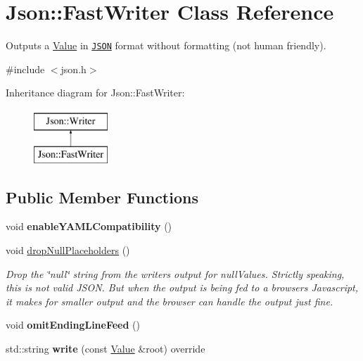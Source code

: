 \hypertarget{class_json_1_1_fast_writer}{}\section{Json\+:\+:Fast\+Writer Class Reference}
\label{class_json_1_1_fast_writer}


Outputs a \hyperlink{class_json_1_1_value}{Value} in \href{http://www.json.org}{\tt J\+S\+ON} format without formatting (not human friendly).  




{\ttfamily \#include $<$json.\+h$>$}

Inheritance diagram for Json\+:\+:Fast\+Writer\+:\begin{figure}[H]
\begin{center}
\leavevmode
\includegraphics[height=2.000000cm]{class_json_1_1_fast_writer}
\end{center}
\end{figure}
\subsection*{Public Member Functions}
\begin{DoxyCompactItemize}
\item 
\mbox{\label{class_json_1_1_fast_writer_a78d98e9f76d33660ad6e6a1abe287d45}} 
void {\bfseries enable\+Y\+A\+M\+L\+Compatibility} ()
\item 
\mbox{\label{class_json_1_1_fast_writer_a6e93d8dce951e408517311026a065b40}} 
void \hyperlink{class_json_1_1_fast_writer_a6e93d8dce951e408517311026a065b40}{drop\+Null\+Placeholders} ()
\begin{DoxyCompactList}\small\item\em Drop the \char`\"{}null\char`\"{} string from the writer\textquotesingle{}s output for null\+Values. Strictly speaking, this is not valid J\+S\+ON. But when the output is being fed to a browser\textquotesingle{}s Javascript, it makes for smaller output and the browser can handle the output just fine. \end{DoxyCompactList}\item 
\mbox{\label{class_json_1_1_fast_writer_af4ee077d365d75941fb2688d97207a55}} 
void {\bfseries omit\+Ending\+Line\+Feed} ()
\item 
\mbox{\label{class_json_1_1_fast_writer_aee69e3f778982ec9218c1a5a7c6a3e7a}} 
std\+::string {\bfseries write} (const \hyperlink{class_json_1_1_value}{Value} \&root) override
\end{DoxyCompactItemize}


